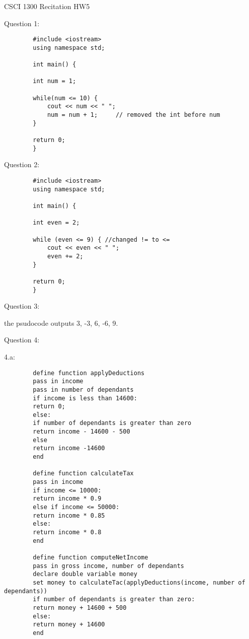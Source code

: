\documentclass{article}
\begin{document}
CSCI 1300 Recitation HW5

\vspace{1cm}

Question 1:
\begin{verbatim}
        #include <iostream> 
        using namespace std;

        int main() {

        int num = 1; 

        while(num <= 10) {
            cout << num << " ";
            num = num + 1;     // removed the int before num
        } 

        return 0; 
        } 
\end{verbatim}

\vspace{1cm}
Question 2:
\begin{verbatim}
        #include <iostream> 
        using namespace std;

        int main() { 

        int even = 2;

        while (even <= 9) { //changed != to <=
            cout << even << " "; 
            even += 2; 
        } 

        return 0; 
        } 
\end{verbatim}

\vspace{1cm}

Question 3:

the psudocode outputs 3, -3, 6, -6, 9.

\vspace{2cm}

Question 4:

\hspace{0.25cm}4.a:

\begin{verbatim}
        define function applyDeductions
        pass in income
        pass in number of dependants
        if income is less than 14600:
        return 0;
        else:
        if number of dependants is greater than zero
        return income - 14600 - 500
        else
        return income -14600
        end

        define function calculateTax
        pass in income
        if income <= 10000:
        return income * 0.9
        else if income <= 50000: 
        return income * 0.85
        else: 
        return income * 0.8
        end

        define function computeNetIncome
        pass in gross income, number of dependants
        declare double variable money
        set money to calculateTac(applyDeductions(income, number of dependants))
        if number of dependants is greater than zero: 
        return money + 14600 + 500
        else: 
        return money + 14600
        end
\end{verbatim}
\end{document}
